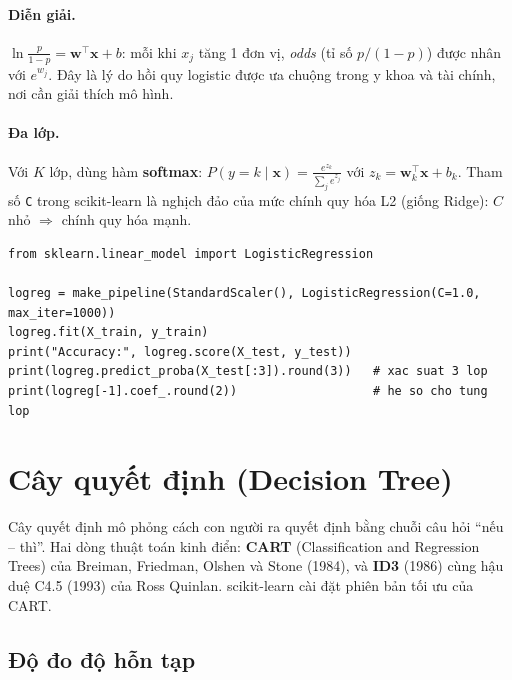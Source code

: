 \paragraph{Diễn giải.} $\ln\frac{p}{1-p} = \mathbf{w}^\top\mathbf{x} + b$: mỗi khi $x_j$ tăng 1 đơn vị, \textit{odds} (tỉ số $p/(1-p)$) được nhân với $e^{w_j}$. Đây là lý do hồi quy logistic được ưa chuộng trong y khoa và tài chính, nơi cần giải thích mô hình.

\paragraph{Đa lớp.} Với $K$ lớp, dùng hàm \textbf{softmax}: $P(y = k \mid \mathbf{x}) = \frac{e^{z_k}}{\sum_{j} e^{z_j}}$ với $z_k = \mathbf{w}_k^\top\mathbf{x} + b_k$. Tham số \texttt{C} trong scikit-learn là nghịch đảo của mức chính quy hóa L2 (giống Ridge): $C$ nhỏ $\Rightarrow$ chính quy hóa mạnh.

\begin{lstlisting}[caption={Logistic Regression với scikit-learn}]
from sklearn.linear_model import LogisticRegression

logreg = make_pipeline(StandardScaler(), LogisticRegression(C=1.0, max_iter=1000))
logreg.fit(X_train, y_train)
print("Accuracy:", logreg.score(X_test, y_test))
print(logreg.predict_proba(X_test[:3]).round(3))   # xac suat 3 lop
print(logreg[-1].coef_.round(2))                   # he so cho tung lop
\end{lstlisting}


\section{Cây quyết định (Decision Tree)}

Cây quyết định mô phỏng cách con người ra quyết định bằng chuỗi câu hỏi ``nếu -- thì''. Hai dòng thuật toán kinh điển: \textbf{CART} (Classification and Regression Trees) của Breiman, Friedman, Olshen và Stone (1984), và \textbf{ID3} (1986) cùng hậu duệ C4.5 (1993) của Ross Quinlan. scikit-learn cài đặt phiên bản tối ưu của CART.

\subsection{Độ đo độ hỗn tạp}

